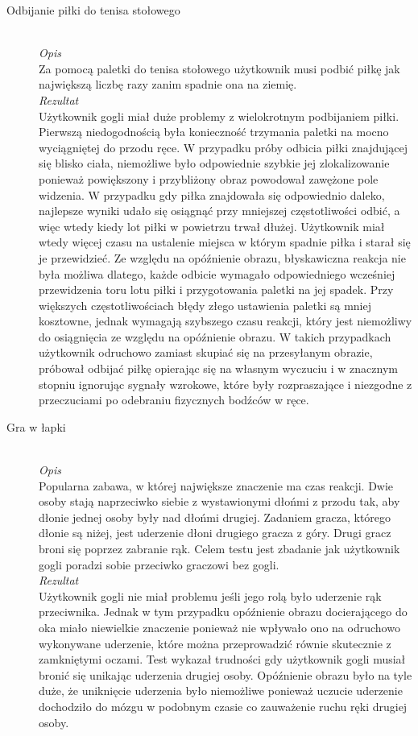\documentclass[a4paper,11pt,twoside]{report}
\theoremstyle{definition}
\begin{document}
\begin{description}
\item[Odbijanie piłki do tenisa stołowego] \hfill \\
\textit{Opis} \\
 Za pomocą paletki do tenisa stołowego użytkownik musi podbić piłkę jak największą liczbę razy zanim spadnie ona na ziemię. \\
 
\textit{Rezultat}\\
Użytkownik gogli miał duże problemy z wielokrotnym podbijaniem piłki. Pierwszą niedogodnością była konieczność trzymania paletki na mocno wyciągniętej do przodu ręce. W przypadku próby odbicia piłki znajdującej się blisko ciała,  niemożliwe było odpowiednie szybkie jej zlokalizowanie ponieważ powiększony i przybliżony obraz powodował zawężone pole widzenia. W przypadku gdy piłka znajdowała się odpowiednio daleko, najlepsze wyniki udało się osiągnąć przy mniejszej częstotliwości odbić, a więc wtedy kiedy lot piłki w powietrzu trwał dłużej. Użytkownik miał wtedy więcej czasu na ustalenie miejsca w którym spadnie piłka i starał się je przewidzieć. Ze względu na opóźnienie obrazu, błyskawiczna reakcja nie była możliwa dlatego, każde odbicie wymagało odpowiedniego wcześniej przewidzenia toru lotu piłki  i przygotowania paletki na jej spadek.  Przy większych częstotliwościach błędy złego ustawienia paletki są mniej kosztowne, jednak wymagają szybszego czasu reakcji, który jest niemożliwy do osiągnięcia ze względu na opóźnienie obrazu. W takich przypadkach użytkownik odruchowo zamiast skupiać się na przesyłanym obrazie, próbował odbijać piłkę opierając się na własnym wyczuciu i w znacznym stopniu ignorując sygnały wzrokowe, które były rozpraszające i niezgodne z przeczuciami po odebraniu fizycznych bodźców w ręce. 

\item[Gra w łapki] \hfill \\
\textit{Opis} \\
Popularna zabawa, w której największe znaczenie ma czas reakcji. Dwie osoby stają naprzeciwko siebie z wystawionymi dłońmi z przodu tak, aby dłonie jednej osoby były nad dłońmi drugiej. Zadaniem gracza, którego dłonie są niżej, jest uderzenie dłoni drugiego gracza z góry. Drugi gracz broni się poprzez zabranie rąk. Celem testu jest zbadanie jak użytkownik gogli poradzi sobie przeciwko graczowi bez gogli. \\

\textit{Rezultat}\\
Użytkownik gogli nie miał problemu jeśli jego rolą było uderzenie rąk przeciwnika. Jednak w tym przypadku opóźnienie obrazu docierającego do oka miało niewielkie znaczenie ponieważ nie wpływało ono na odruchowo wykonywane uderzenie, które można przeprowadzić równie skutecznie z zamkniętymi oczami. Test wykazał trudności gdy użytkownik gogli musiał bronić się unikając uderzenia drugiej osoby. Opóźnienie obrazu było na tyle duże, że uniknięcie uderzenia było niemożliwe ponieważ uczucie uderzenie dochodziło do mózgu w podobnym czasie co zauważenie ruchu ręki drugiej osoby.


\end{description}
\end{document}
